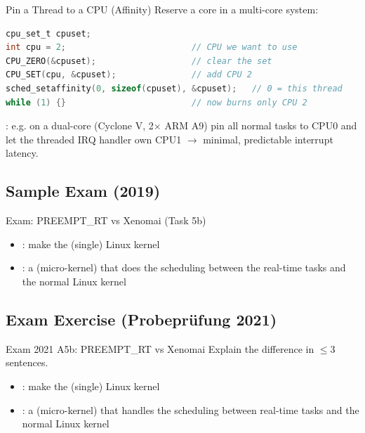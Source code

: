 \begin{KR}{Pin a Thread to a CPU (Affinity)}
    Reserve a core in a multi-core system:
\begin{lstlisting}[language=C, style=basesmol, aboveskip=2pt, belowskip=2pt]
cpu_set_t cpuset;
int cpu = 2;                         // CPU we want to use
CPU_ZERO(&cpuset);                   // clear the set
CPU_SET(cpu, &cpuset);               // add CPU 2
sched_setaffinity(0, sizeof(cpuset), &cpuset);   // 0 = this thread
while (1) {}                         // now burns only CPU 2
\end{lstlisting}
\end{KR}

\begin{remark}
    : e.g. on a dual-core (Cyclone V, 2$\times$
    ARM A9) pin all normal tasks to CPU0 and let the threaded IRQ handler own CPU1
    $\to$ minimal, predictable interrupt latency.
\end{remark}

\subsection{Sample Exam (2019)}

\begin{example2}{Exam: PREEMPT\_RT vs Xenomai (Task 5b)}
    \begin{itemize}
        \item {}: make the (single) Linux kernel 
        \item {}: a  (micro-kernel) that does the
              scheduling between the real-time tasks and the normal Linux kernel
    \end{itemize}
\end{example2}

\subsection{Exam Exercise (Probepr\"ufung 2021)}

\begin{example2}{Exam 2021 A5b: PREEMPT\_RT vs Xenomai}
    Explain the difference in $\leq$3 sentences.
    \tcblower
    \begin{itemize}
        \item {}: make the (single) Linux kernel 
        \item {}: a  (micro-kernel) that handles
              the scheduling between real-time tasks and the normal Linux kernel
    \end{itemize}
\end{example2}

\raggedcolumns
